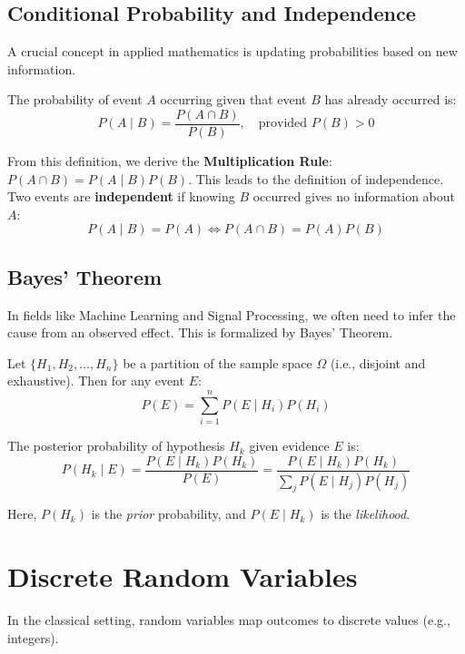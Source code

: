 \documentclass[oneside]{book}
\begin{document}
\subsection{Conditional Probability and Independence}

A crucial concept in applied mathematics is updating probabilities based on new information.

\begin{definition}
The probability of event $A$ occurring given that event $B$ has already occurred is:
\[ P(A \mid B) = \frac{P(A \cap B)}{P(B)}, \quad \text{provided } P(B) > 0 \]
\end{definition}

From this definition, we derive the \textbf{Multiplication Rule}: $P(A \cap B) = P(A \mid B)P(B)$. This leads to the definition of independence. Two events are \textbf{independent} if knowing $B$ occurred gives no information about $A$:
\[ P(A \mid B) = P(A) \iff P(A \cap B) = P(A)P(B) \]

\subsection{Bayes' Theorem}

In fields like Machine Learning and Signal Processing, we often need to infer the cause from an observed effect. This is formalized by Bayes' Theorem.

\begin{theorem}
Let $\{H_1, H_2, \dots, H_n\}$ be a partition of the sample space $\Omega$ (i.e., disjoint and exhaustive). Then for any event $E$:
\[ P(E) = \sum_{i=1}^n P(E \mid H_i)P(H_i) \]
\end{theorem}

\begin{theorem}
The posterior probability of hypothesis $H_k$ given evidence $E$ is:
\[ P(H_k \mid E) = \frac{P(E \mid H_k)P(H_k)}{P(E)} = \frac{P(E \mid H_k)P(H_k)}{\sum_{j} P(E \mid H_j)P(H_j)} \]
\end{theorem}
Here, $P(H_k)$ is the \textit{prior} probability, and $P(E \mid H_k)$ is the \textit{likelihood}.

\section{Discrete Random Variables}

In the classical setting, random variables map outcomes to discrete values (e.g., integers).
\end{document}
